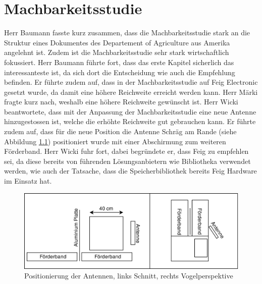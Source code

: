 \documentclass[parskip=full, a4paper]{scrreprt}
\begin{document}
\chapter{Machbarkeitsstudie}
Herr Baumann fasste kurz zusammen, dass die Machbarkeitsstudie stark an die Struktur eines Dokumentes des Departement of Agriculture aus Amerika angelehnt ist. Zudem ist die Machbarkeitsstudie sehr stark wirtschaftlich fokussiert. Herr Baumann führte fort, dass das erste Kapitel sicherlich das interessanteste ist, da sich dort die Entscheidung wie auch die Empfehlung befinden. Er führte zudem auf, dass in der Machbarkeitsstudie auf Feig Electronic gesetzt wurde, da damit eine höhere Reichweite erreicht werden kann. Herr Märki fragte kurz nach, weshalb eine höhere Reichweite gewünscht ist. Herr Wicki beantwortete, dass mit der Anpassung der Machbarkeitsstudie eine neue Antenne hinzugestossen ist, welche die erhöhte Reichweite gut gebrauchen kann. Er führte zudem auf, dass für die neue Position die Antenne Schräg am Rande (siehe Abbildung \ref{fig:antenneSchraeg}) positioniert wurde mit einer Abschirmung zum weiteren Förderband. Herr Wicki fuhr fort, dabei begründete er, dass Feig zu empfehlen sei, da diese bereits von führenden Lösungsanbietern wie Bibliotheka verwendet werden, wie auch der Tatsache, dass die Speicherbibliothek bereits Feig Hardware im Einsatz hat.

\begin{figure}[htb]
	\centering
	\includegraphics[keepaspectratio,width=.6\linewidth]{img/PositionierungAntennen}
	\caption{Positionierung der Antennen, links Schnitt, rechts Vogelperspektive}
	\label{fig:antenneSchraeg}
\end{figure}
\end{document}
